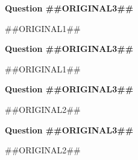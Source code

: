 \documentclass[11pt]{article}
\begin{document}



\begin{minipage}{\linewidth}

\raggedcolumns
\setlength{\columnseprule}{0.5pt}
\begin{multicols}{2}

\textbf{Question ##{{ORIGINAL3}}##} \par
##{{ORIGINAL1}}## \par

\columnbreak

\textbf{Question ##{{ORIGINAL3}}##} \par
##{{ORIGINAL1}}## \par

\end{multicols}
\end{minipage}




\begin{minipage}{\linewidth}

\raggedcolumns
\setlength{\columnseprule}{0.5pt}
\begin{multicols}{2}

\textbf{Question ##{{ORIGINAL3}}##} \par
##{{ORIGINAL2}}## \par

\columnbreak

\textbf{Question ##{{ORIGINAL3}}##} \par
##{{ORIGINAL2}}## \par

\end{multicols}
\end{minipage}



\end{document}
